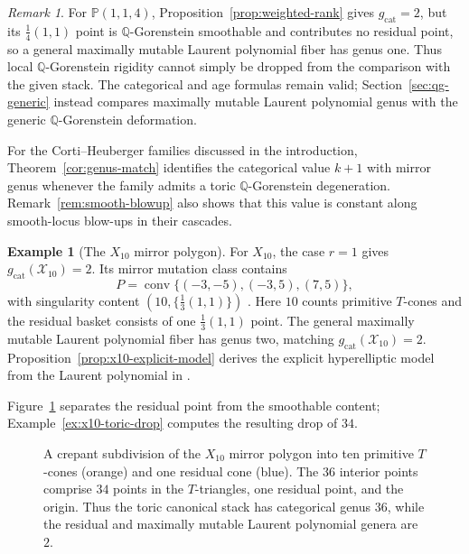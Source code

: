 \documentclass[11pt]{article}
\theoremstyle{plain}
\theoremstyle{definition}
\newtheorem{example}[theorem]{Example}
\theoremstyle{remark}
\newtheorem{remark}[theorem]{Remark}
\newcommand{\cX}{\mathcal X}
\newcommand{\Q}{\mathbb Q}
\newcommand{\Pj}{\mathbb P}
\newcommand{\1}{\mathbf 1}
\begin{document}
\begin{remark}\label{rem:local-rigidity-needed}
For $\Pj(1,1,4)$, Proposition~\ref{prop:weighted-rank} gives $g_{\mathrm{cat}}=2$, but its $\frac14(1,1)$ point is $\Q$-Gorenstein smoothable and contributes no residual point, so a general maximally mutable Laurent polynomial fiber has genus one.  Thus local $\Q$-Gorenstein rigidity cannot simply be dropped from the comparison with the given stack.  The categorical and age formulas remain valid; Section~\ref{sec:qg-generic} instead compares maximally mutable Laurent polynomial genus with the generic $\Q$-Gorenstein deformation.
\end{remark}

For the Corti--Heuberger families discussed in the introduction, Theorem~\ref{cor:genus-match} identifies the categorical value $k+1$ with mirror genus whenever the family admits a toric $\Q$-Gorenstein degeneration.  Remark~\ref{rem:smooth-blowup} also shows that this value is constant along smooth-locus blow-ups in their cascades.

\begin{example}[The $X_{10}$ mirror polygon]\label{ex:x10-mirror-polygon}
For $X_{10}$, the case $r=1$ gives $g_{\mathrm{cat}}(\cX_{10})=2$.  Its mirror mutation class contains
\[
P=\operatorname{conv}\{(-3,-5),(-3,5),(7,5)\},
\]
with singularity content $(10,\{\frac13(1,1)\})$ \cite[Table 4 and Theorem 9]{KNP}.  Here $10$ counts primitive $T$-cones and the residual basket consists of one $\frac13(1,1)$ point.  The general maximally mutable Laurent polynomial fiber has genus two, matching $g_{\mathrm{cat}}(\cX_{10})=2$.  Proposition~\ref{prop:x10-explicit-model} derives the explicit hyperelliptic model from the Laurent polynomial in \cite[Section 7.3, entry 11]{OP}.
\end{example}

Figure~\ref{fig:x10-subdivision} separates the residual point from the smoothable content; Example~\ref{ex:x10-toric-drop} computes the resulting drop of $34$.
\begin{figure}[htbp]
\centering

\caption{A crepant subdivision of the $X_{10}$ mirror polygon into ten primitive $T$-cones (orange) and one residual cone (blue).  The $36$ interior points comprise $34$ points in the $T$-triangles, one residual point, and the origin.  Thus the toric canonical stack has categorical genus $36$, while the residual and maximally mutable Laurent polynomial genera are $2$.}
\label{fig:x10-subdivision}
\end{figure}
\end{document}
